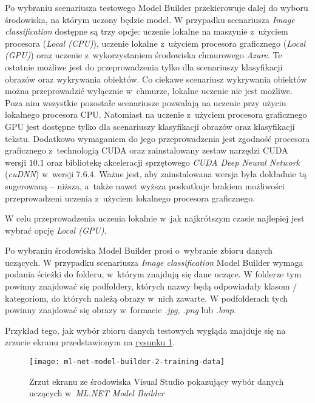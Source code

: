 Po wybraniu scenariusza testowego Model Builder przekierowuje dalej do wyboru środowiska, na którym uczony będzie model.
W przypadku scenariusza \emph{Image classification} dostępne są trzy opcje: uczenie lokalne na maszynie z~użyciem procesora (\emph{Local (CPU)}), uczenie lokalne z~użyciem procesora graficznego (\emph{Local (GPU)}) oraz uczenie z~wykorzystaniem środowiska chmurowego \emph{Azure}.
Te ostatnie możliwe jest do przeprowadzenia tylko dla scenariuszy klasyfikacji obrazów oraz wykrywania obiektów.
Co ciekawe scenariusz wykrywania obiektów można przeprowadzić wyłącznie w~chmurze, lokalne uczenie nie jest możliwe.
Poza nim wszystkie pozostałe scenariusze pozwalają na uczenie przy użyciu lokalnego procesora CPU.
Natomiast na uczenie z~użyciem procesora graficznego GPU jest dostępne tylko dla scenariuszy klasyfikacji obrazów oraz klasyfikacji tekstu.
Dodatkowo wymaganiem do jego przeprowadzenia jest zgodność procesora graficznego z~technologią CUDA oraz zainstalowany zestaw narzędzi CUDA wersji $10.1$ oraz bibliotekę akceleracji sprzętowego \emph{CUDA Deep Neural Network} (\emph{cuDNN}) w~wersji $7.6.4$.
Ważne jest, aby zainstalowana wersja była dokładnie tą sugerowaną -- niższa, a~także nawet wyższa poskutkuje brakiem możliwości przeprowadzeni uczenia z~użyciem lokalnego procesora graficznego.

W celu przeprowadzenia uczenia lokalnie w~jak najkrótszym czasie najlepiej jest wybrać opcję \emph{Local (GPU)}.

Po wybraniu środowiska Model Builder prosi o~wybranie zbioru danych uczących.
W przypadku scenariusza \emph{Image classification} Model Builder wymaga podania ścieżki do folderu, w~którym znajdują się dane uczące.
W folderze tym powinny znajdować się podfoldery, których nazwy będą odpowiadały klasom / kategoriom, do których należą obrazy w~nich zawarte.
W podfolderach tych powinny znajdować się obrazy w~formacie \emph{.jpg}, \emph{.png} lub \emph{.bmp}.

Przykład tego, jak wybór zbioru danych testowych wygląda znajduje się na zrzucie ekranu przedstawionym na \hyperref[fig:ml-net-model-builder-2-training-data]{rysunku \ref*{fig:ml-net-model-builder-2-training-data}}.

\begin{figure}[ht]
  \texttt{[image: ml-net-model-builder-2-training-data]}
  \caption{Zrzut ekranu ze środowiska Visual Studio pokazujący wybór danych uczących w~\emph{ML.NET Model Builder}}
  \label{fig:ml-net-model-builder-2-training-data}
\end{figure}

